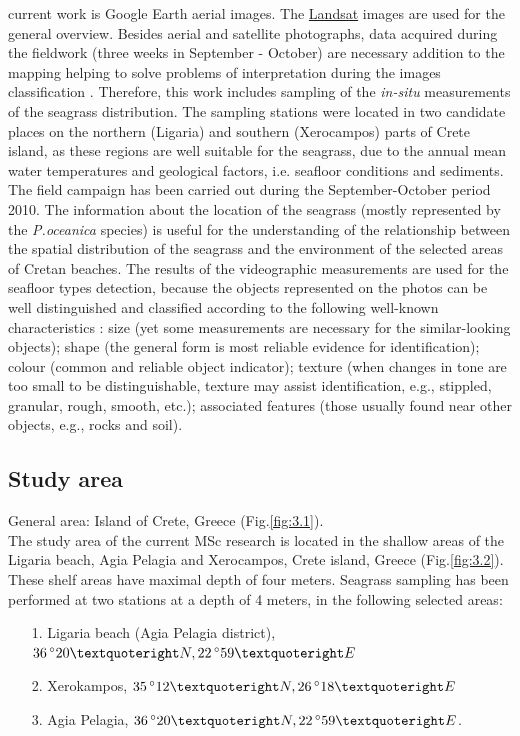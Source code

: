 \documentclass[11pt]{article}
\begin{document}
current work is Google Earth aerial images. The  \href{http://landsat.gsfc.nasa.gov/}{Landsat} images are used for the general overview.
Besides aerial and satellite photographs, data acquired during the fieldwork (three weeks in September - October) are
necessary addition to the mapping helping to solve problems of interpretation during the images
classification \cite{Pasqualini98a}\label{Pasqualini98a}. Therefore, this work includes sampling of the \textit{in-situ}
measurements of the seagrass distribution.
The sampling stations were located in two candidate places on the northern (Ligaria) and southern
(Xerocampos) parts of Crete island, as these regions are well suitable for the seagrass, due to the
annual mean water temperatures and geological factors, i.e. seafloor conditions and sediments. \\ The
field campaign has been carried out during the September-October period 2010. 
The information about the location of the seagrass (mostly represented by the \textit{P.oceanica} species) is useful for the
understanding of the relationship between the spatial distribution of the seagrass and the environment
of the selected areas of Cretan beaches. The results of the videographic measurements are used for the
seafloor types detection, because the objects represented on the photos can be well distinguished and
classified according to the following well-known characteristics \cite{Butler87}\label{Butler87}: size (yet some
measurements are necessary for the similar-looking objects); shape (the general form is most reliable
evidence for identification); colour (common and reliable object indicator); texture (when changes in
tone are too small to be distinguishable, texture may assist identification, e.g., stippled, granular,
rough, smooth, etc.); associated features (those usually found near other objects, e.g., rocks and soil).

\subsection{Study area}
General area: Island of Crete, Greece (Fig.\ref{fig:3.1})\label{page-23}.\\
The study area of the current MSc research is located in the shallow areas of the Ligaria beach, Agia
Pelagia and Xerocampos, Crete island, Greece (Fig.\ref{fig:3.2}). These shelf areas have maximal depth of four meters.
Seagrass sampling has been performed at two stations at a depth of 4 meters, in the following selected
areas:
\begin{itemize}
	\item [1.] Ligaria beach (Agia Pelagia district), $36\,^{\circ}20\textquoteright N, 22\,^{\circ}59\textquoteright E$ 
	\item [2.] Xerokampos, $35\,^{\circ}12\textquoteright N, 26\,^{\circ}18\textquoteright E$
	\item [3.] Agia Pelagia, $36\,^{\circ}20\textquoteright N, 22\,^{\circ}59\textquoteright E$.
\end{itemize}
\end{document}
